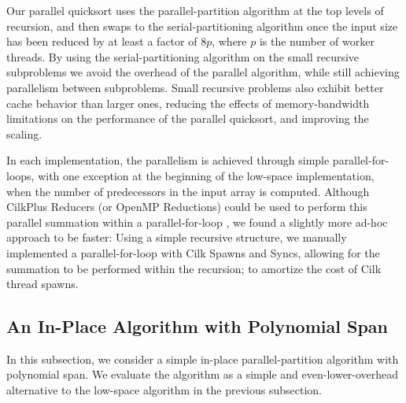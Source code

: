 \documentclass[sigconf]{acmart}
\renewcommand{\paragraph}[1]{\vspace{0.09in}\noindent{\bf \boldmath #1.}}
\theoremstyle{remark}
\theoremstyle{remark}
\begin{document}
Our parallel quicksort uses the parallel-partition algorithm at the
top levels of recursion, and then swaps to the serial-partitioning
algorithm once the input size has been reduced by at least a factor of
$8p$, where $p$ is the number of worker threads. By using the
serial-partitioning algorithm on the small recursive subproblems we
avoid the overhead of the parallel algorithm, while still achieving
parallelism between subproblems. Small recursive problems also exhibit
better cache behavior than larger ones, reducing the effects of
memory-bandwidth limitations on the performance of the parallel
quicksort, and improving the scaling.


\paragraph{Implementation Details}
In each implementation, the parallelism is achieved through simple
parallel-for-loops, with one exception at the beginning of the
low-space implementation, when the number of predecessors in the input
array is computed. Although CilkPlus Reducers (or OpenMP Reductions)
could be used to perform this parallel summation within a
parallel-for-loop \cite{FrigoLe09}, we found a slightly more ad-hoc
approach to be faster: Using a simple recursive structure, we manually
implemented a parallel-for-loop with Cilk Spawns and Syncs, allowing
for the summation to be performed within the recursion; to amortize
the cost of Cilk thread spawns.

\subsection{An In-Place Algorithm with Polynomial Span}\label{subsechighspan}

In this subsection, we consider a simple in-place parallel-partition
algorithm with polynomial span. We evaluate the algorithm as a simple
and even-lower-overhead alternative to the low-space algorithm in the
previous subsection.
\end{document}
